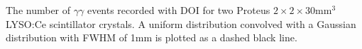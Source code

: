 \label{fig:confinement} The number of $\gamma\gamma$ events recorded with DOI for two Proteus $2\times2\times30$mm$^3$ LYSO:Ce scintillator crystals. A uniform distribution convolved with a Gaussian distribution with FWHM of 1mm is plotted as a dashed black line.